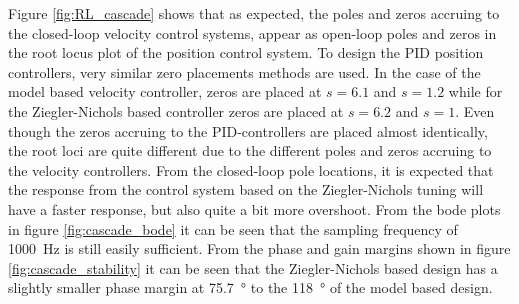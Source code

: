 \documentclass[../../main.tex]{subfiles}
\begin{document}
Figure \ref{fig:RL_cascade} shows that as expected, the poles and zeros accruing to the closed-loop velocity control systems, appear as open-loop poles and zeros in the root locus plot of the position control system. To design the PID position controllers, very similar zero placements methods  are used. In the case of the model based velocity controller, zeros are placed at $s = 6.1$ and $s = 1.2$ while for the Ziegler-Nichols based controller zeros are placed at $s = 6.2$ and $s = 1$. Even though the zeros accruing to the PID-controllers are placed almost identically, the root loci are quite different due to the different poles and zeros accruing to the velocity controllers. From the closed-loop pole locations, it is expected that the response from the control system based on the Ziegler-Nichols tuning will have a faster response, but also quite a bit more overshoot. From the bode plots in figure \ref{fig:cascade_bode} it can be seen that the sampling frequency of \SI{1000}{\hertz} is still easily sufficient. From the phase and gain margins shown in figure \ref{fig:cascade_stability} it can be seen that the Ziegler-Nichols based design has a slightly smaller phase margin at \SI{75.7}{\degree} to the \SI{118}{\degree} of the model based design.
\end{document}
